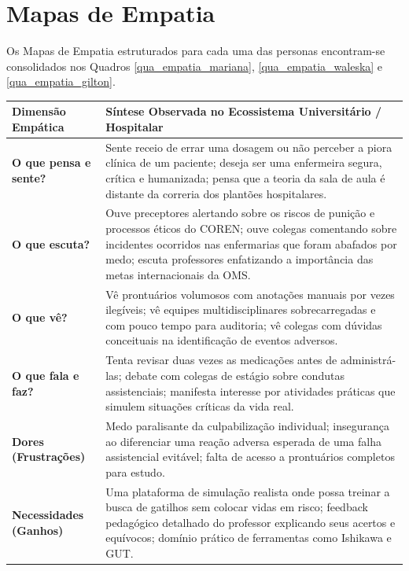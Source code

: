 \section{Mapas de Empatia}
\label{sec_mapas_empatia}

Os Mapas de Empatia estruturados para cada uma das personas encontram-se consolidados nos Quadros \ref{qua_empatia_mariana}, \ref{qua_empatia_waleska} e \ref{qua_empatia_gilton}.

\begin{quadro}[htb]
\centering
\small
\caption{Mapa de Empatia - Persona 1: Mariana Resende (Discente de Enfermagem).}
\label{qua_empatia_mariana}
\begin{tabularx}{\textwidth}{p{3.8cm} X}
\toprule
\textbf{Dimensão Empática} & \textbf{Síntese Observada no Ecossistema Universitário / Hospitalar} \\
\midrule
\textbf{O que pensa e sente?} & Sente receio de errar uma dosagem ou não perceber a piora clínica de um paciente; deseja ser uma enfermeira segura, crítica e humanizada; pensa que a teoria da sala de aula é distante da correria dos plantões hospitalares. \\
\midrule
\textbf{O que escuta?} & Ouve preceptores alertando sobre os riscos de punição e processos éticos do COREN; ouve colegas comentando sobre incidentes ocorridos nas enfermarias que foram abafados por medo; escuta professores enfatizando a importância das metas internacionais da OMS. \\
\midrule
\textbf{O que vê?} & Vê prontuários volumosos com anotações manuais por vezes ilegíveis; vê equipes multidisciplinares sobrecarregadas e com pouco tempo para auditoria; vê colegas com dúvidas conceituais na identificação de eventos adversos. \\
\midrule
\textbf{O que fala e faz?} & Tenta revisar duas vezes as medicações antes de administrá-las; debate com colegas de estágio sobre condutas assistenciais; manifesta interesse por atividades práticas que simulem situações críticas da vida real. \\
\midrule
\textbf{Dores (Frustrações)} & Medo paralisante da culpabilização individual; insegurança ao diferenciar uma reação adversa esperada de uma falha assistencial evitável; falta de acesso a prontuários completos para estudo. \\
\midrule
\textbf{Necessidades (Ganhos)} & Uma plataforma de simulação realista onde possa treinar a busca de gatilhos sem colocar vidas em risco; feedback pedagógico detalhado do professor explicando seus acertos e equívocos; domínio prático de ferramentas como Ishikawa e GUT. \\
\bottomrule
\end{tabularx}
\end{quadro}


